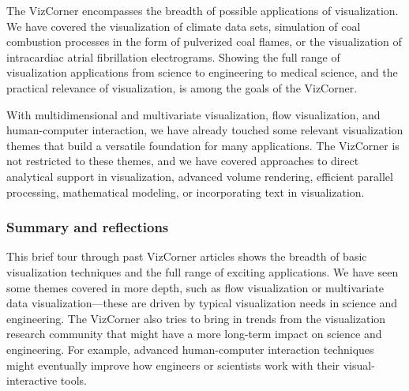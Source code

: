 \documentclass[10pt,journal,compsoc]{IEEEtran}
\begin{document}
The VizCorner encompasses the breadth of possible applications of visualization. We have covered the visualization of climate data sets, simulation of coal combustion processes in the form of pulverized coal flames, or the visualization of intracardiac atrial fibrillation electrograms. Showing the full range of visualization applications from science to engineering to medical science, and the practical relevance of visualization, is among the goals of the VizCorner. 

With multidimensional and multivariate visualization, flow visualization, and human-computer interaction, we have already touched some relevant visualization themes that build a versatile foundation for many applications. The VizCorner is not restricted to these themes, and we have covered approaches to direct analytical support in visualization, advanced volume rendering, efficient parallel processing, mathematical modeling, or incorporating text in visualization.  %





\subsubsection*{Summary and reflections}

This brief tour through past VizCorner articles shows the breadth of basic visualization techniques and the full range of exciting applications. We have seen some themes covered in more depth, such as flow visualization or multivariate data visualization---these are driven by typical visualization needs in science and engineering. The VizCorner also tries to bring in trends from the visualization research community that might have a more long-term impact on science and engineering. For example, advanced human-computer interaction techniques might eventually improve how engineers or scientists work with their visual-interactive tools. 
\end{document}
